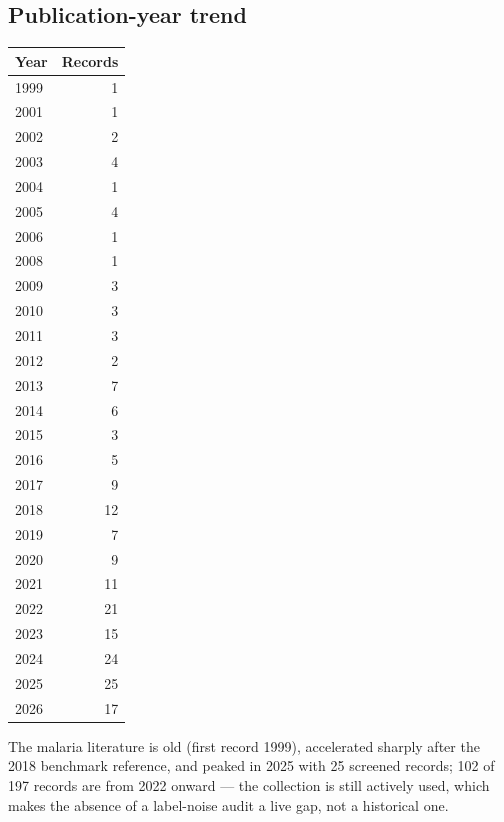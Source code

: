 \subsection*{Publication-year trend}
\begin{tabular}{lr}
\hline
Year & Records \\
\hline
1999 & 1 \\
2001 & 1 \\
2002 & 2 \\
2003 & 4 \\
2004 & 1 \\
2005 & 4 \\
2006 & 1 \\
2008 & 1 \\
2009 & 3 \\
2010 & 3 \\
2011 & 3 \\
2012 & 2 \\
2013 & 7 \\
2014 & 6 \\
2015 & 3 \\
2016 & 5 \\
2017 & 9 \\
2018 & 12 \\
2019 & 7 \\
2020 & 9 \\
2021 & 11 \\
2022 & 21 \\
2023 & 15 \\
2024 & 24 \\
2025 & 25 \\
2026 & 17 \\
\hline
\end{tabular}

The malaria literature is old (first record 1999), accelerated sharply after the 2018 benchmark reference, and peaked in 2025 with 25 screened records; 102 of 197 records are from 2022 onward --- the collection is still actively used, which makes the absence of a label-noise audit a live gap, not a historical one.\par

